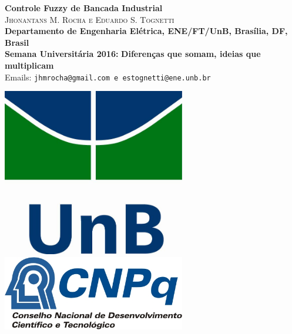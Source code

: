 \documentclass[a0,portrait]{a0poster}
\begin{document}
\begin{minipage}[b]{0.75\linewidth}
{\centering
\fontsize{80}{120} \color{NavyBlue} \textbf{Controle Fuzzy de Bancada Industrial} \color{Black}\\[1.5cm] %

\huge \textsc{Jhonantans M. Rocha e Eduardo S. Tognetti}\\[0.5cm] %

\Large{\bf Departamento de Engenharia Elétrica, ENE/FT/UnB, Brasília, DF, Brasil}\\[0.5cm]
\Large{\bf Semana Universitária 2016: }
\large{\bf Diferenças que somam, ideias que multiplicam}\\[0.5cm]
\Large Emails: \texttt{jhmrocha@gmail.com e estognetti@ene.unb.br}\\
}
\end{minipage}
%
\begin{minipage}[b]{0.12\linewidth}
\includegraphics[width=8cm]{imgs/logo.png} \vspace{3cm}\\
\includegraphics[width=8cm]{imgs/cnpq.jpg}\\
\end{minipage}
\end{document}
